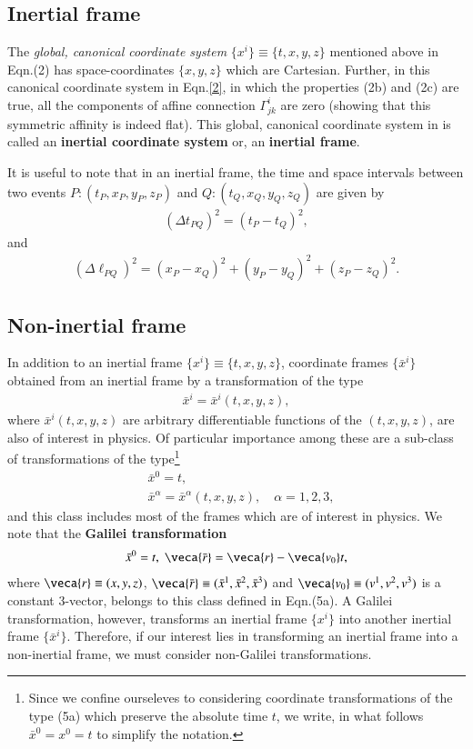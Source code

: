 \documentclass[10pt]{article}
\begin{document}
\subsection{Inertial frame}
The \textsl{global, canonical coordinate system} 
$\{x^i\}\equiv\{t, x,y,z\} $ mentioned above in Eqn.(2) has 
space-coordinates $\{x,y,z\}$ which are Cartesian. Further, 
in this canonical coordinate system in Eqn.\eqref{2}, in 
which the properties (2b) and (2c) are true, all the 
components of affine connection $\Gamma^i_{jk}$ are    zero 
(showing that this  symmetric affinity \bmsf{\Gamma} is 
indeed flat). This global, canonical coordinate system in 
 is called an \textbf{inertial coordinate system} 
or, 
an \textbf{inertial frame}. 

It is useful to note that in an inertial frame, the time 
and 
space intervals between two events $P:(t_P,x_P,y_P,z_P)$ 
and $Q:(t_Q,x_Q,y_Q,z_Q)$  are given by
\begin{align}\label{3}
(\Delta  t_{PQ})^2=(t_P-t_Q)^2,
\end{align}
and 
\begin{align}\label{4}
(\Delta  \ell_{PQ})^2=(x_P-x_Q)^2+(y_P-y_Q)^2+(z_P-z_Q)^2.
\end{align}

\subsection{Non-inertial frame} 
In addition to an inertial frame $\{x^i\}\equiv\{t,x,y,z\}$, 
coordinate frames  $\{\bar{x}^i\}$ obtained from an 
inertial frame by a transformation of the type 
\begin{align}\label{5}
\bar{x}^i=\bar{x}^i(t, x,y,z),
\end{align}
where $\bar{x}^i (t, x,y,z)$ are arbitrary differentiable 
functions of the $(t, x,y,z)$,  are also of interest in 
physics. Of particular importance among these are a 
sub-class of transformations of the type\footnote{Since we 
confine ourseleves to considering coordinate 
transformations of the type (5a) which preserve the 
absolute time $t$, we write, in what follows   
$\bar{x}^0=x^0=t$ to simplify the notation.} 
\begin{align*}\tag{5a}
& \bar{x}^0= t,\\
& \bar{x}^\alpha=\bar{x}^\alpha(t, x,y,z),\quad 
\alpha=1,2,3,
\end{align*}
and this class includes most of the  frames which are of 
interest in physics. We note that the \textbf{Galilei 
transformation} 
\begin{align}\label{6}
 \bar{x}^0=t,\;\veca{\bar{r}} 
=\veca{r}-\veca{v_0}t ,
\end{align}
where $\veca{{r}}\equiv  
(x,y,z)$, $\veca{\bar{r}}\equiv  
(\bar{x}^1,\bar{x}^2,\bar{x}^3)$ and $\veca{v_0}\equiv  
(v^1,v^2,v^3)$ is a constant 3-vector, belongs to this 
class defined in Eqn.(5a). A Galilei transformation, 
however,  transforms an  inertial frame $\{x^i\}$ into 
another inertial frame $\{\bar{x}^i\}$. Therefore, if our 
interest lies in transforming an inertial frame into a 
non-inertial frame, we must consider non-Galilei 
transformations. 
\end{document}
